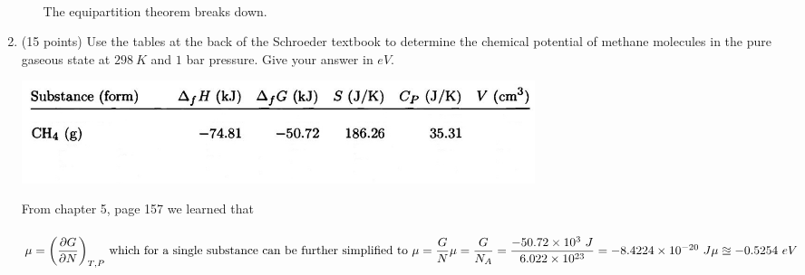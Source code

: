 \documentclass[fleqn]{article}
\begin{document}
\begin{enumerate}
\begin{enumerate}
      \textcolor{hwColor}{
        \\
        The equipartition theorem breaks down.
        \\
      }

    \end{enumerate}

    \pagebreak

    \item (15 points) Use the tables at the back of the Schroeder textbook to determine the chemical
    potential of methane molecules in the pure gaseous state at $298 ~ K$ and $1$ bar pressure. Give
    your answer in $eV$.
    \begin{center}
      \includegraphics[height=3cm, width=15cm]{question5.JPG}
    \end{center}

      \textcolor{hwColor}{
        From chapter 5, page 157 we learned that
        \\
        \\
        $
          \mu=\bigg( \dfrac{\partial G}{\partial N} \bigg)_{T, P}
          \text{ which for a single substance can be further simplified to }
          \mu=\dfrac{G}{N}
          \\
          \\
          \\
          \mu=\dfrac{G}{N_A}=\dfrac{-50.72 \times 10^3 ~ J}{6.022 \times 10^{23}}=-8.4224 \times 10^{-20} ~ J
          \\
          \\
          \\
          \mu \approxeq -0.5254 ~ eV
        $
      }

    \pagebreak


\end{enumerate}
\end{document}
